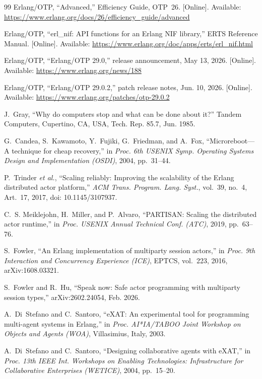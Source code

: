 \documentclass[conference,letterpaper]{IEEEtran}
\begin{document}
\begin{thebibliography}{99}
Erlang/OTP, ``Advanced,'' Efficiency Guide, OTP~26. [Online]. Available:
\url{https://www.erlang.org/docs/26/efficiency_guide/advanced}

Erlang/OTP, ``erl\_nif: API functions for an Erlang NIF library,'' ERTS
Reference Manual. [Online]. Available:
\url{https://www.erlang.org/doc/apps/erts/erl_nif.html}

Erlang/OTP, ``Erlang/OTP 29.0,'' release announcement, May 13, 2026.
[Online]. Available: \url{https://www.erlang.org/news/188}

Erlang/OTP, ``Erlang/OTP 29.0.2,'' patch release notes, Jun. 10, 2026.
[Online]. Available: \url{https://www.erlang.org/patches/otp-29.0.2}

J.~Gray, ``Why do computers stop and what can be done about it?'' Tandem
Computers, Cupertino, CA, USA, Tech. Rep. 85.7, Jun. 1985.

G.~Candea, S.~Kawamoto, Y.~Fujiki, G.~Friedman, and A.~Fox,
``Microreboot---A technique for cheap recovery,'' in \emph{Proc. 6th USENIX
Symp. Operating Systems Design and Implementation (OSDI)}, 2004,
pp.~31--44.

P.~Trinder \emph{et al.}, ``Scaling reliably: Improving the scalability of
the Erlang distributed actor platform,'' \emph{ACM Trans. Program. Lang.
Syst.}, vol.~39, no.~4, Art.~17, 2017, doi: 10.1145/3107937.

C.~S. Meiklejohn, H.~Miller, and P.~Alvaro, ``PARTISAN: Scaling the
distributed actor runtime,'' in \emph{Proc. USENIX Annual Technical Conf.
(ATC)}, 2019, pp.~63--76.

S.~Fowler, ``An Erlang implementation of multiparty session actors,'' in
\emph{Proc. 9th Interaction and Concurrency Experience (ICE)}, EPTCS,
vol.~223, 2016, arXiv:1608.03321.

S.~Fowler and R.~Hu, ``Speak now: Safe actor programming with multiparty
session types,'' arXiv:2602.24054, Feb. 2026.

A.~Di~Stefano and C.~Santoro, ``eXAT: An experimental tool for programming
multi-agent systems in Erlang,'' in \emph{Proc. AI*IA/TABOO Joint Workshop
on Objects and Agents (WOA)}, Villasimius, Italy, 2003.

A.~Di~Stefano and C.~Santoro, ``Designing collaborative agents with eXAT,''
in \emph{Proc. 13th IEEE Int. Workshops on Enabling Technologies:
Infrastructure for Collaborative Enterprises (WETICE)}, 2004, pp.~15--20.


\end{thebibliography}
\end{document}
